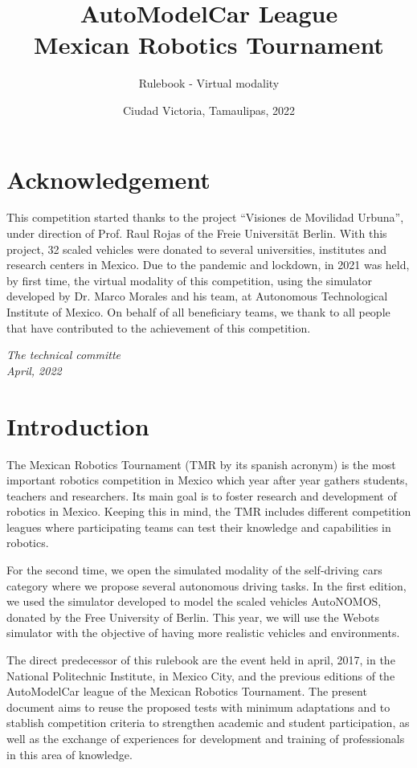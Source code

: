 \documentclass[letterpaper,12pt]{article}
\title{AutoModelCar League\\Mexican Robotics Tournament}
\author{Rulebook - Virtual modality}
\date{Ciudad Victoria, Tamaulipas, 2022}
\begin{document}
\renewcommand{\tablename}{Tabla}
\maketitle

\section*{Acknowledgement}
This competition started thanks to the project ``Visiones de Movilidad Urbuna'', under direction of Prof. Raul Rojas of the Freie Universität Berlin. With this project, 32 scaled vehicles were donated to several universities, institutes and research centers in Mexico. Due to the pandemic and lockdown, in 2021 was held, by first time, the virtual modality of this competition, using the simulator developed by Dr. Marco Morales and his team, at Autonomous  Technological Institute of Mexico. On behalf of all beneficiary teams, we thank to all people that have contributed to the achievement of this competition.

\begin{flushright}
  \textit{
  The technical committe\\
  April, 2022
  }
\end{flushright}

\section{Introduction}
The Mexican Robotics Tournament (TMR by its spanish acronym) is the most important robotics competition in Mexico which year after year gathers students, teachers and researchers. Its main goal is to foster research and development of robotics in Mexico. Keeping this in mind, the TMR includes different competition leagues where participating teams can test their knowledge and capabilities in robotics.

For the second time, we open the simulated modality of the self-driving cars category where we propose several autonomous driving tasks. In the first edition, we used the simulator developed to model the scaled vehicles AutoNOMOS, donated by the Free University of Berlin. This year, we will use the Webots simulator with the objective of having more realistic vehicles and environments.

The direct predecessor of this rulebook are the event held in april, 2017, in the National Politechnic Institute, in Mexico City, and the previous editions of the AutoModelCar league of the Mexican Robotics Tournament. The present document aims to reuse the proposed tests with minimum adaptations and to stablish competition criteria to strengthen academic and student participation, as well as the exchange of experiences for development and training of professionals in this area of knowledge. 
\end{document}
